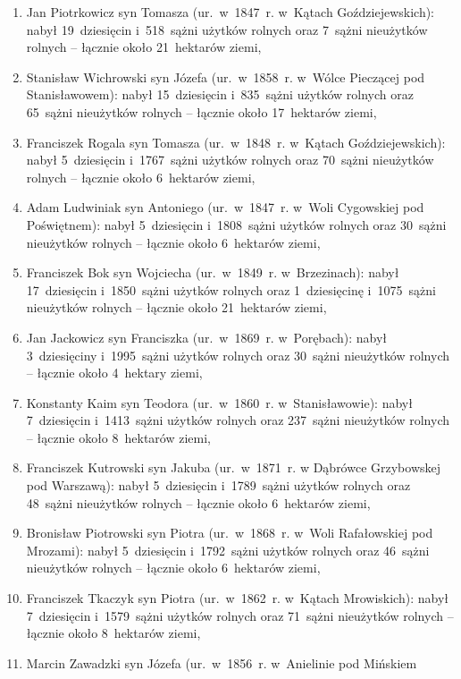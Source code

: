 \begin{enumerate}
    \item Jan Piotrkowicz syn Tomasza (ur.~w~1847~r. w~Kątach
    Goździejewskich): nabył 19~dziesięcin i~518~sążni użytków rolnych oraz
    7~sążni nieużytków rolnych -- łącznie około 21~hektarów ziemi,
    \item Stanisław Wichrowski syn Józefa (ur.~w~1858~r. w~Wólce Pieczącej pod
    Stanisławowem): nabył 15~dziesięcin i~835~sążni użytków rolnych oraz
    65~sążni nieużytków rolnych -- łącznie około 17~hektarów ziemi,
    \item Franciszek Rogala syn Tomasza (ur.~w~1848~r. w~Kątach
    Goździejewskich): nabył 5~dziesięcin i~1767~sążni użytków rolnych oraz
    70~sążni nieużytków rolnych -- łącznie około 6~hektarów ziemi,
    \item Adam Ludwiniak syn Antoniego (ur.~w~1847~r. w~Woli Cygowskiej pod
    Poświętnem): nabył 5~dziesięcin i~1808~sążni użytków rolnych oraz
    30~sążni nieużytków rolnych -- łącznie około 6~hektarów ziemi,
    \item Franciszek Bok syn Wojciecha (ur.~w~1849~r. w~Brzezinach): nabył
    17~dziesięcin i~1850~sążni użytków rolnych oraz 1~dziesięcinę
    i~1075~sążni nieużytków rolnych -- łącznie około 21~hektarów ziemi,
    \item Jan Jackowicz syn Franciszka (ur.~w~1869~r. w~Porębach): nabył
    3~dziesięciny i~1995~sążni użytków rolnych oraz 30~sążni nieużytków
    rolnych -- łącznie około 4~hektary ziemi,
    \item Konstanty Kaim syn Teodora (ur.~w~1860~r. w~Stanisławowie): nabył
    7~dziesięcin i~1413~sążni użytków rolnych oraz 237~sążni nieużytków
    rolnych -- łącznie około 8~hektarów ziemi,
    \item Franciszek Kutrowski syn Jakuba (ur.~w~1871~r. w Dąbrówce Grzybowskej
    pod Warszawą): nabył 5~dziesięcin i~1789~sążni użytków rolnych oraz
    48~sążni nieużytków rolnych -- łącznie około 6~hektarów ziemi,
    \item Bronisław Piotrowski syn Piotra (ur.~w~1868~r. w~Woli Rafałowskiej
    pod Mrozami): nabył 5~dziesięcin i~1792~sążni użytków rolnych oraz
    46~sążni nieużytków rolnych -- łącznie około 6~hektarów ziemi,
    \item Franciszek Tkaczyk syn Piotra (ur.~w~1862~r. w~Kątach Mrowiskich):
    nabył 7~dziesięcin i~1579~sążni użytków rolnych oraz 71~sążni nieużytków
    rolnych -- łącznie około 8~hektarów ziemi,
    \item Marcin Zawadzki syn Józefa (ur.~w~1856~r. w~Anielinie pod Mińskiem

\end{enumerate}
